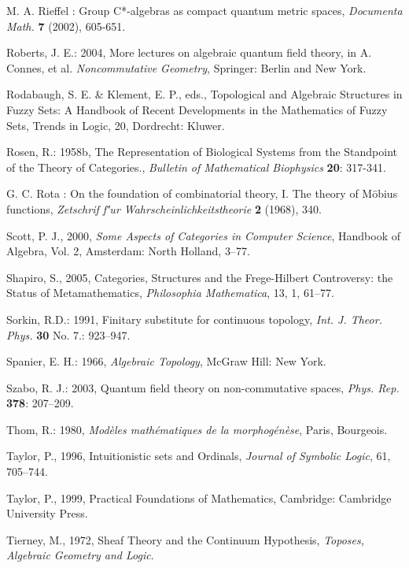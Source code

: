 \documentclass[12pt]{article}
\theoremstyle{plain}
\theoremstyle{definition}
\numberwithin{equation}{section}
\begin{document}
\begin{thebibliography}{199}
M. A. Rieffel : Group C*-algebras as compact quantum metric spaces, \emph{Documenta Math.} \textbf{7} (2002), 605-651.

Roberts, J. E.: 2004, More lectures on algebraic quantum field theory, in A. Connes, et al. \emph{Noncommutative Geometry}, Springer: Berlin and New York.

Rodabaugh, S. E. \& Klement, E. P., eds., Topological and Algebraic Structures in Fuzzy Sets: A Handbook of Recent Developments in the Mathematics of Fuzzy Sets, Trends in Logic, 20, Dordrecht: Kluwer. 


Rosen, R.: 1958b, The Representation of Biological Systems from the Standpoint of the Theory of Categories., \emph{ Bulletin of Mathematical Biophysics} \textbf{20}: 317-341.

 G. C. Rota : On the foundation of combinatorial theory, I. The theory of M\"obius functions, \emph{Zetschrif f\''ur Wahrscheinlichkeitstheorie} \textbf{2} (1968), 340.

Scott, P. J., 2000, {\em Some Aspects of Categories in Computer Science}, Handbook of Algebra, Vol. 2, Amsterdam: North Holland, 3--77. 

Shapiro, S., 2005, Categories, Structures and the Frege-Hilbert Controversy: the Status of Metamathematics, 
{\em Philosophia Mathematica}, 13, 1, 61--77.

Sorkin, R.D.: 1991, Finitary substitute for continuous topology, \emph{Int. J. Theor. Phys.} \textbf{30} No. 7.: 923--947.

Spanier, E. H.: 1966, \emph{Algebraic Topology}, McGraw Hill: New York.

Szabo, R. J.: 2003, Quantum field theory on non-commutative spaces, \emph{Phys. Rep.} \textbf{378}: 207--209.

Thom, R.: 1980, \emph{Mod\`eles math\'ematiques de la morphog\'en\`ese}, Paris, Bourgeois.

Taylor, P., 1996, Intuitionistic sets and Ordinals, {\em Journal of Symbolic Logic}, 61, 705--744.
 
Taylor, P., 1999, Practical Foundations of Mathematics, Cambridge: Cambridge University Press. 

Tierney, M., 1972, Sheaf Theory and the Continuum Hypothesis, {\em Toposes, Algebraic Geometry and Logic}.


\end{thebibliography}
\end{document}
